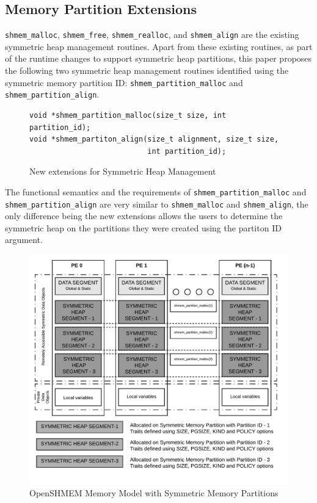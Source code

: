 \subsection{Memory Partition Extensions}
\label{src:smempart/extensions}
\texttt{shmem\_malloc}, \texttt{shmem\_free}, \texttt{shmem\_realloc},
and \texttt{shmem\_align} are the existing symmetric heap management
routines. Apart from these existing routines, as part of the runtime
changes to support symmetric heap partitions, this paper proposes the
following two symmetric heap management routines identified using the
symmetric memory partition ID: \texttt{shmem\_partition\_malloc} and
\texttt{shmem\_partition\_align}.

\begin{figure}
    \lstset{language=c,
            keywordstyle=\bfseries,
            basicstyle=\tt\small,
            frame=single}
    \begin{lstlisting}
void *shmem_partition_malloc(size_t size, int partition_id);
void *shmem_partiton_align(size_t alignment, size_t size,
                           int partition_id);
    \end{lstlisting}
    \caption{New extensions for Symmetric Heap Management}
    \label{fig:extensions}
\end{figure}

The functional semantics and the requirements of
\texttt{shmem\_partition\_malloc} and \texttt{shmem\_partition\_align}
are very similar to \texttt{shmem\_malloc} and \texttt{shmem\_align},
the only difference being the new extensions allows the users to
determine the symmetric heap on the partitions they were created using
the partiton ID argument.

\begin{figure}[!h]
    \vspace{-20pt}
    \hspace*{5mm}
    \includegraphics[scale=0.20]{image/smem-model.png}
    \vspace{-25pt}
    \caption{OpenSHMEM Memory Model with Symmetric Memory Partitions}
    \label{fig:smem-model}
\end{figure}

